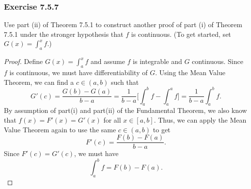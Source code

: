 \subsubsection{Exercise 7.5.7} Use part (ii) of Theorem 7.5.1 to construct another proof of part (i) of Theorem 7.5.1 under the stronger hypothesis that \( f  \) is continuous. (To get started, set \( G(x) = \int_{ a }^{ x }  f   \).)
\begin{proof}
	Define \( G(x) = \int_{ a }^{ x  } f   \) and assume \( f  \) is integrable and \( G  \) continuous. Since \( f  \) is continuous, we must have differentiability of \( G  \). Using the Mean Value Theorem, we can find a \(c \in (a,b)  \) such that 
	\[  G'(c) = \frac{ G(b) - G(a)  }{ b -a  } = \frac{ 1 }{ b-a  } \Bigg[ \int_{ a }^{ b } f  - \int_{ a }^{ a } f \Bigg]   =  \frac{ 1 }{ b-a  } \int_{ a }^{ b } f.  \]
	By assumption of part(i) and part(ii) of the Fundamental Theorem, we also know that \( f(x) = F'(x) = G'(x)  \) for all \( x \in [a,b]  \). Thus, we can apply the Mean Value Theorem again to use the same \( c \in (a,b)  \) to get 
	\[  F'(c) =  \frac{ F(b) - F(a)  }{ b -a  }. \] Since \( F'(c) = G'(c)   \), we must have 
	\[  \int_{ a }^{ b } f = F(b) - F(a). \]
\end{proof}



